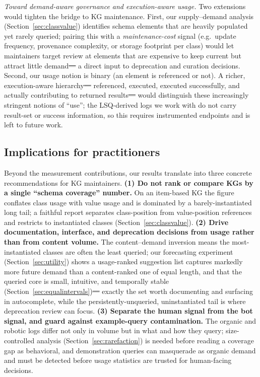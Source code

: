 \documentclass[sw]{iosart2x}
\providecommand{\DIFadd}[1]{{\protect\color{blue}\uwave{#1}}} %
\providecommand{\DIFdel}[1]{{\protect\color{red}\sout{#1}}} %
\providecommand{\DIFaddbegin}{} %
\providecommand{\DIFaddend}{} %
\providecommand{\DIFdelbegin}{} %
\providecommand{\DIFdelend}{} %
\providecommand{\DIFscaledelfig}{0.5}
\newlength{\DIFdelgraphicswidth} %
\newlength{\DIFdelgraphicsheight} %
\providecommand{\DIFaddincludegraphics}[2][]{{\color{blue}\fbox{\DIFOincludegraphics[#1]{#2}}}} %
\providecommand{\DIFdelincludegraphics}[2][]{%
\sbox{\DIFdelgraphicsbox}{\DIFOincludegraphics[#1]{#2}}%
\settoboxwidth{\DIFdelgraphicswidth}{\DIFdelgraphicsbox} %
\settoboxtotalheight{\DIFdelgraphicsheight}{\DIFdelgraphicsbox} %
\scalebox{\DIFscaledelfig}{%
\parbox[b]{\DIFdelgraphicswidth}{\usebox{\DIFdelgraphicsbox}\\[-\baselineskip] \rule{\DIFdelgraphicswidth}{0em}}\llap{\resizebox{\DIFdelgraphicswidth}{\DIFdelgraphicsheight}{%
\setlength{\unitlength}{\DIFdelgraphicswidth}%
\begin{picture}(1,1)%
\thicklines\linethickness{2pt} %
{\color[rgb]{1,0,0}\put(0,0){\framebox(1,1){}}}%
{\color[rgb]{1,0,0}\put(0,0){\line( 1,1){1}}}%
{\color[rgb]{1,0,0}\put(0,1){\line(1,-1){1}}}%
\end{picture}%
}\hspace*{3pt}}} %
} %
\DeclareRobustCommand{\DIFaddbegin}{\DIFOaddbegin \let\includegraphics\DIFaddincludegraphics} %
\DeclareRobustCommand{\DIFaddend}{\DIFOaddend \let\includegraphics\DIFOincludegraphics} %
\DeclareRobustCommand{\DIFdelbegin}{\DIFOdelbegin \let\includegraphics\DIFdelincludegraphics} %
\DeclareRobustCommand{\DIFdelend}{\DIFOaddend \let\includegraphics\DIFOincludegraphics} %
\begin{document}
\emph{Toward demand-aware governance and execution-aware usage.} Two extensions would tighten the bridge to KG maintenance. First, our supply--demand analysis (Section~\ref{sec:classvalue}) identifies schema elements that are heavily populated yet rarely queried; pairing this with a \emph{maintenance-cost} signal (e.g.\ update frequency, provenance complexity, or storage footprint per class) would let maintainers target review at elements that are expensive to keep current but attract little demand\DIFdelbegin \DIFdel{--- }\DIFdelend \DIFaddbegin \DIFadd{, }\DIFaddend a direct input to deprecation and curation decisions. Second, our usage notion is binary (an element is referenced or not). A richer, execution-aware hierarchy\DIFdelbegin \DIFdel{--- }\DIFdelend \DIFaddbegin \DIFadd{: }\DIFaddend referenced, executed, executed successfully, and actually contributing to returned results\DIFdelbegin \DIFdel{--- }\DIFdelend \DIFaddbegin \DIFadd{, }\DIFaddend would distinguish these increasingly stringent notions of ``use''; the LSQ-derived logs we work with do not carry result-set or success information, so this requires instrumented endpoints and is left to future work.

\subsection{Implications for practitioners}\label{sec:implications}
Beyond the measurement contributions, our results translate into three concrete recommendations for KG maintainers. \textbf{(1) Do not rank or compare KGs by a single ``schema coverage'' number.} On an item-based KG the figure conflates class usage with value usage and is dominated by a barely-instantiated long tail; a faithful report separates class-position from value-position references and restricts to instantiated classes (Section~\ref{sec:classvalue}). \textbf{(2) Drive documentation, interface, and deprecation decisions from usage rather than from content volume.} The content--demand inversion means the most-instantiated classes are often the least queried; our forecasting experiment (Section~\ref{sec:utility}) shows a usage-ranked suggestion list captures markedly more future demand than a content-ranked one of equal length, and that the queried core is small, intuitive, and temporally stable (Section~\ref{sec:equalintervals})\DIFdelbegin \DIFdel{--- }\DIFdelend \DIFaddbegin \DIFadd{, }\DIFaddend exactly the set worth documenting and surfacing in autocomplete, while the persistently-unqueried, uninstantiated tail is where deprecation review can focus. \textbf{(3) Separate the human signal from the bot signal, and guard against example-query contamination.} The organic and robotic logs differ not only in volume but in what and how they query; size-controlled analysis (Section~\ref{sec:rarefaction}) is needed before reading a coverage gap as behavioral, and demonstration queries can masquerade as organic demand and must be detected before usage statistics are trusted for human-facing decisions.
\end{document}
